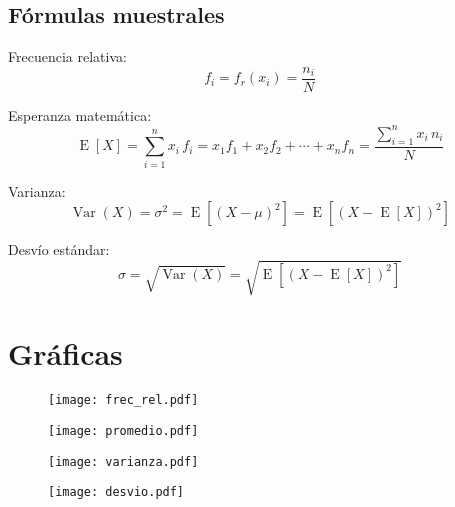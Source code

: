 \subsection{Fórmulas muestrales}
Frecuencia relativa:
\begin{equation}
f_{i} = f_{r}(x_{i}) = \frac {n_{i}}{N}
\end{equation}

Esperanza matemática:
\begin{equation}
\operatorname{E}[X] = \sum_{i=1}^{n}x_{i}\,f_{i}=x_{1}f_{1}+x_{2}f_{2}+\cdots +x_{n}f_{n} = \frac{\sum_{i=1}^{n}x_{i}\,n_{i}}{N}
\end{equation}

Varianza:
\begin{equation}
\operatorname{Var}(X) = \sigma^{2} = \operatorname{E}\left[(X - \mu)^{2}\right] = \operatorname{E}\left[(X - \operatorname{E}[X])^{2}\right]
\end{equation}

Desvío estándar:
\begin{equation}
\sigma = \sqrt{\operatorname{Var}(X)} = \sqrt{\operatorname{E}\left[(X - \operatorname{E}[X])^{2}\right]}
\end{equation}

\pagebreak  %
\section{Gráficas}
\begin{figure}[H]
  \centering
  \texttt{[image: frec\_rel.pdf]}
  \label{fig:frec_rel}
\end{figure}

\begin{figure}[H]
  \centering
  \texttt{[image: promedio.pdf]}
  \label{fig:promedio}
\end{figure}

\begin{figure}[H]
  \centering
  \texttt{[image: varianza.pdf]}
  \label{fig:varianza}
\end{figure}

\begin{figure}[H]
  \centering
  \texttt{[image: desvio.pdf]}
  \label{fig:desvio}
\end{figure}

  

